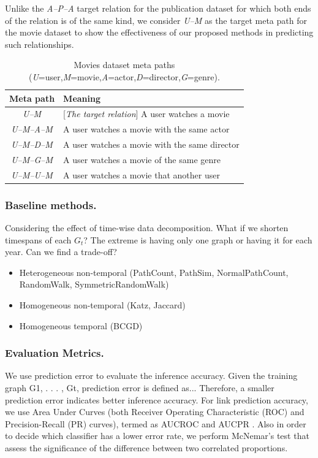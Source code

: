 Unlike the \textit{A--P--A} target relation for the publication dataset for which both ends of the relation is of the same kind, we consider \textit{U--M} as the target meta path for the movie dataset to show the effectiveness of our proposed methods in predicting such relationships.

\begin{table}[h]
\centering
\caption{Movies dataset meta paths (\textit{U}=user,\textit{M}=movie,\textit{A}=actor,\textit{D}=director,\textit{G}=genre).}
\scriptsize
\label{table_movies}
\begin{tabular}{|c|l|} \hline
\textbf{Meta path} & \textbf{Meaning} \\ \hline
\textit{U--M} & [\textit{The target relation}] A user watches a movie \\ \hline

\textit{U--M--A--M} & A user watches a movie with the same actor \\ \hline
\textit{U--M--D--M} & A user watches a movie with the same director \\ \hline
\textit{U--M--G--M} & A user watches a movie of the same genre \\ \hline
\textit{U--M--U--M} & A user watches a movie that another user  \\ \hline

\end{tabular}
\end{table}


\subsubsection{Baseline methods.} Considering the effect of time-wise data decomposition. What if we shorten timespans of each $G_t$? The extreme is having only one graph or having it for each year. Can we find a trade-off?

\begin{itemize}
    \item  Heterogeneous non-temporal (PathCount, PathSim, NormalPathCount, RandomWalk, SymmetricRandomWalk)
    \item  Homogeneous non-temporal (Katz, Jaccard)
    \item  Homogeneous temporal (BCGD)
\end{itemize}

\subsubsection{Evaluation Metrics.} We use prediction error to evaluate the inference accuracy. Given the training graph G1, . . . , Gt, prediction error is defined as... Therefore, a smaller prediction error indicates better inference accuracy. For link prediction accuracy, we use Area Under Curves (both Receiver Operating Characteristic (ROC) and Precision-Recall (PR) curves), termed as AUCROC and AUCPR \cite{davis2006relationship}. Also in order to decide which classifier has a lower error rate, we perform McNemar's test that assess the significance of the difference between two correlated proportions.


